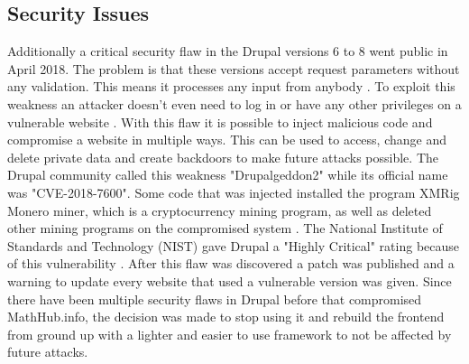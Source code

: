 \documentclass[11pt,a4paper]{article}
\begin{document}
\subsection{Security Issues} \label{security}
Additionally a critical security flaw in the Drupal versions 6 to 8 went public in April 2018.
The problem is that these versions accept request parameters without any validation.
This means it processes any input from anybody \cite{zdnet}.
To exploit this weakness an attacker doesn't even need to log in or have any other privileges on a vulnerable website \cite{register}.
With this flaw it is possible to inject malicious code and compromise a website in multiple ways.
This can be used to access, change and delete private data and create backdoors to make future attacks possible.
The Drupal community called this weakness "Drupalgeddon2" while its official name was "CVE-2018-7600".
Some code that was injected installed the program XMRig Monero miner, which is a cryptocurrency mining program, as well as deleted other mining programs on the compromised system \cite{hacker}.
The National Institute of Standards and Technology (NIST) gave Drupal a "Highly Critical" rating because of this vulnerability \cite{nist}.
After this flaw was discovered a patch was published and a warning to update every website that used a vulnerable version was given.
\newline \newline	
Since there have been multiple security flaws in Drupal before that compromised MathHub.info, the decision was made to stop using it and rebuild the frontend from ground up with a lighter and easier to use framework to not be affected by future attacks.
\end{document}
